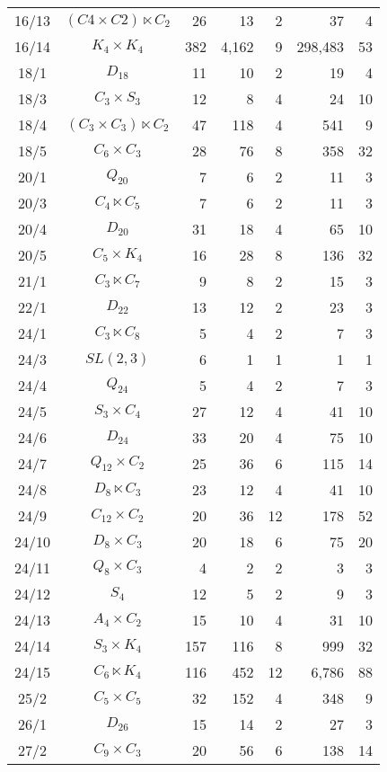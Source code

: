 \documentclass[a4paper,11pt]{article}
\theoremstyle{plain}
\theoremstyle{definition}
\begin{document}
\begin{longtable}{ccrrrrr}
	16/13 & $(C4 \times C2) \ltimes C_2$ & 26 & 13 & 2 & 37 & 4 \\ 
	16/14 & $K_4 \times K_4$ & 382 & 4,162 & 9 & 298,483 & 53  \\ 
	18/1 & $D_{18}$ & 11 & 10 & 2 & 19 & 4 \\ 
	18/3 & $C_3 \times S_3$ & 12 & 8 & 4 & 24 & 10 \\ 
	18/4 & $(C_3 \times C_3) \ltimes C_2$ & 47 & 118 & 4 & 541 & 9 \\ 
	18/5 & $C_6 \times C_3$ & 28 & 76 & 8 & 358 & 32 \\ 
	20/1 & $Q_{20}$ & 7 & 6 & 2 & 11 & 3 \\ 
	20/3 & $C_4 \ltimes C_5$ & 7 & 6 & 2 & 11 & 3 \\ 
	20/4 & $D_{20}$ & 31 & 18 & 4 & 65 & 10 \\ 
	20/5 & $C_5 \times K_4$ & 16 & 28 & 8 & 136 & 32 \\ 
	21/1 & $C_3 \ltimes C_7$ & 9 & 8 & 2 & 15 & 3 \\ 
	22/1 & $D_{22}$ & 13 & 12 & 2 & 23 & 3 \\ 
	24/1 & $C_3 \ltimes C_8$ & 5 & 4 & 2 & 7 & 3 \\ 
	24/3 & $SL(2,3)$ & 6 & 1 & 1 & 1 & 1 \\ 
	24/4 & $Q_{24}$ & 5 & 4 & 2 & 7 & 3 \\ 
	24/5 & $S_3 \times C_4$ & 27 & 12 & 4 & 41 & 10 \\ 
	24/6 & $D_{24}$ & 33 & 20 & 4 & 75 & 10 \\ 
	24/7 & $Q_{12} \times C_2$ & 25 & 36 & 6 & 115 & 14 \\ 
	24/8 & $D_8 \ltimes C_3$ & 23 & 12 & 4 & 41 & 10 \\ 
	24/9 & $C_{12} \times C_2$ & 20 & 36 & 12 & 178 & 52 \\ 
	24/10 & $D_8 \times C_3$ & 20 & 18 & 6 & 75 & 20 \\ 
	24/11 & $Q_8 \times C_3$ & 4 & 2 & 2 & 3 & 3 \\ 
	24/12 & $S_4$ & 12 & 5 & 2 & 9 & 3 \\ 
	24/13 & $A_4 \times C_2$ & 15 & 10 & 4 & 31 & 10 \\ 
	24/14 & $S_3 \times K_4$ & 157 & 116 & 8 & 999 & 32 \\ 
	24/15 & $C_6 \ltimes K_4$ & 116 & 452 & 12 & 6,786 & 88 \\ 
	25/2 & $C_5 \times C_5$ & 32 & 152 & 4 & 348 & 9 \\ 
	26/1 & $D_{26}$ & 15 & 14 & 2 & 27 & 3 \\ 
	27/2 & $C_9 \times C_3$ & 20 & 56 & 6 & 138 & 14 \\ 

\end{longtable}
\end{document}
